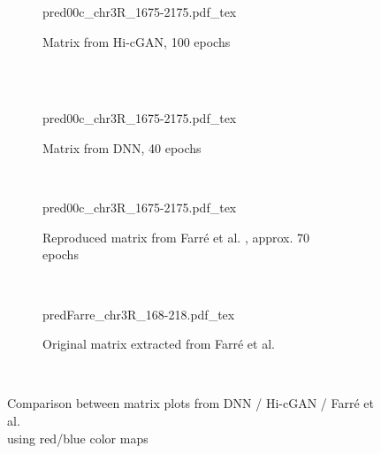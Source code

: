 \begin{figure}[htbp]
\begin{subfigure}{\textwidth}
 \centering
 \scriptsize
 {pred00c_chr3R_1675-2175.pdf_tex}
 \caption{Matrix from Hi-cGAN, 100 epochs} \label{fig:appendix:farre-vs-ours_cgan-matrix}
\end{subfigure}\\[5mm]
\\[2mm]
\begin{subfigure}{\textwidth}
 \centering
 \scriptsize
 {pred00c_chr3R_1675-2175.pdf_tex}
 \caption{Matrix from DNN, 40 epochs} \label{fig:appendix:farre-vs-ours_dnn-matrix}
\end{subfigure}\\[3mm]
\begin{subfigure}{\textwidth}
 \centering
 \scriptsize
 {pred00c_chr3R_1675-2175.pdf_tex}
 \caption{Reproduced matrix from Farr\'e et al. \cite{Farre2018a}, approx. 70 epochs} \label{fig:appendix:farre-vs-ours_farre-matrix_recreated}
\end{subfigure}\\[5mm]
\begin{subfigure}{\textwidth}
 \centering
 \scriptsize
 {predFarre_chr3R_168-218.pdf_tex}
 \caption{Original matrix extracted from Farr\'e et al. \cite{Farre2018a}} \label{fig:appendix:farre-vs-ours_farre-matrix_original}
\end{subfigure}\\[5mm]
\caption{Comparison between matrix plots from DNN / Hi-cGAN / Farr\'e et al. \cite{Farre2018a}\\using red/blue color maps} \label{fig:appendix:farre-vs-ours_matrices}
\end{figure}
